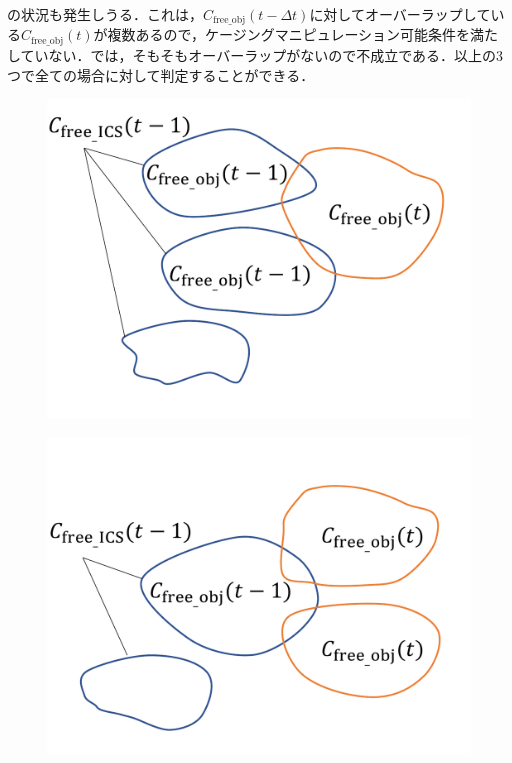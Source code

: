 \documentclass[a4paper,twoside,12pt,papersize, dvipdfmx]{iirthesis}
\begin{document}
{の状況も発生しうる．これは，$C_{\mathrm{free\_obj}}(t-\Delta t)$に対してオーバーラップしている$C_{\mathrm{free\_obj}}(t)$が複数あるので，ケージングマニピュレーション可能条件を満たしていない．では，そもそもオーバーラップがないので不成立である．以上の3つで全ての場合に対して判定することができる．

\begin{figure}[b]
\begin{minipage}{0.33\hsize}
\includegraphics[width=\hsize]{fig/3-new-planner/rev_cagingmani_ver1.pdf}
\subcaption{}\label{fig::planner::cm1}
\end{minipage}\hfill
\begin{minipage}{0.33\hsize}
\includegraphics[width=\hsize]{fig/3-new-planner/rev_cagingmani_ver2.pdf}

\end{minipage}
\end{figure}}
\end{document}
